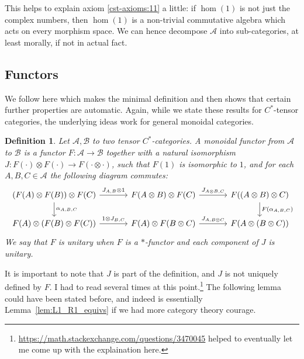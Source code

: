 \documentclass[a4paper,11pt]{article}
\theoremstyle{plain}
\newtheorem{definition}[proposition]{Definition}
\theoremstyle{remark}
\newcommand{\mc}[1]{\mathcal{#1}}
\begin{document}
This helps to explain axiom \ref{cst-axioms:11} a little: if $\hom(1)$ is not just the complex numbers, then $\hom(1)$ is a non-trivial commutative algebra which acts on every morphism space.  We can hence decompose $\mc A$ into sub-categories, at least morally, if not in actual fact.


\subsection{Functors}

We follow \cite{EGNO_TensorCategories} here which makes the minimal definition and then shows that certain further properties are automatic.  Again, while we state these results for $C^*$-tensor categories, the underlying ideas work for general monoidal categories.

\begin{definition}\label{defn:monoidal_functor}
Let $\mc A, \mc B$ to two tensor $C^*$-categories.  A \emph{monoidal functor} from $\mc A$ to $\mc B$ is a functor $F \colon \mc A \to \mc B$ together with a natural isomorphism $J \colon F(\cdot) \otimes F(\cdot) \to F(\cdot\otimes\cdot)$, such that $F(1)$ is isomorphic to $1$, and for each $A,B,C\in\mc A$ the following diagram commutes:
\[\begin{tikzcd}[column sep=8ex]
( F(A) \otimes F(B) ) \otimes F(C) \ar[r, "J_{A,B}\otimes 1"] \ar[d, "\alpha_{A,B,C}"]
   & F(A\otimes B) \otimes F(C) \ar[r, "J_{A\otimes B,C}"]
   & F((A\otimes B)\otimes C) \ar[d, "F(\alpha_{A,B,C})"]  \\
F(A) \otimes (F(B) \otimes F(C)) \ar[r, "1 \otimes J_{B,C}"]
   & F(A) \otimes F(B\otimes C) \ar[r, "J_{A,B\otimes C}"] 
   & F(A\otimes(B\otimes C))  
\end{tikzcd}\]
We say that $F$ is \emph{unitary} when $F$ is a $*$-functor and each component of $J$ is unitary.
\end{definition}

It is important to note that $J$ is part of the definition, and $J$ is not uniquely defined by $F$.  I had to read \cite{EGNO_TensorCategories} several times at this point.\footnote{\url{https://math.stackexchange.com/questions/3470045} helped to eventually let me come up with the explaination here.}  The following lemma could have been stated before, and indeed is essentially Lemma~\ref{lem:L1_R1_equivs} if we had more category theory courage.
\end{document}
